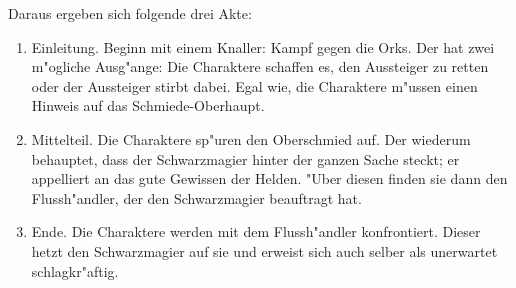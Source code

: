 Daraus ergeben sich folgende drei Akte:
\begin{enumerate}
  \item Einleitung. Beginn mit einem Knaller: Kampf gegen die Orks. Der hat zwei m"ogliche Ausg"ange: Die Charaktere schaffen es, den Aussteiger zu retten oder der Aussteiger stirbt dabei. Egal wie, die Charaktere m"ussen einen Hinweis auf das Schmiede-Oberhaupt.

  \item Mittelteil. Die Charaktere sp"uren den Oberschmied auf. Der wiederum behauptet, dass der Schwarzmagier hinter der ganzen Sache steckt; er appelliert an das gute Gewissen der Helden. "Uber diesen finden sie dann den Flussh"andler, der den Schwarzmagier beauftragt hat.

  \item Ende. Die Charaktere werden mit dem Flussh"andler konfrontiert. Dieser hetzt den Schwarzmagier auf sie und erweist sich auch selber als unerwartet schlagkr"aftig.
\end{enumerate}



